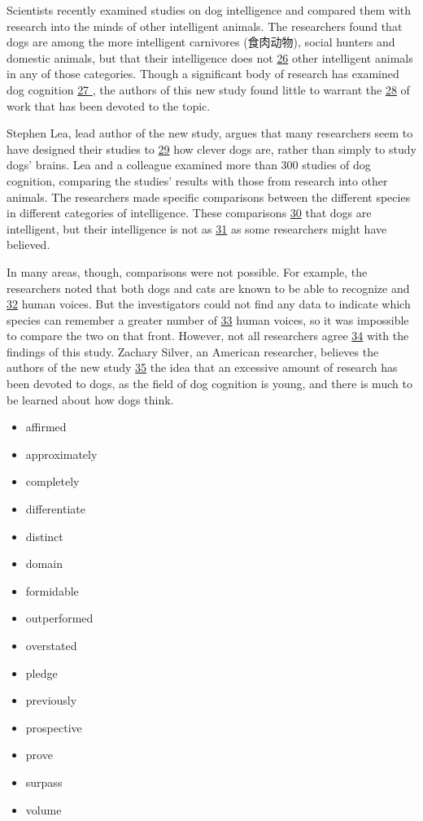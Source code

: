\documentclass[UTF8,11pt]{ctexart}
\begin{document}
Scientists recently examined studies on dog intelligence and compared them with research into the minds of other intelligent animals. The researchers found that dogs are among the more intelligent carnivores (食肉动物), social hunters and domestic animals, but that their intelligence does not \uline{26} other intelligent animals in any of those categories. Though a significant body of research has examined dog cognition \uline{27 }, the authors of this new study found little to warrant the \uline{28} of work that has been devoted to the topic.


Stephen Lea, lead author of the new study, argues that many researchers seem to have designed their studies to \uline{29} how clever dogs are, rather than simply to study dogs’ brains. Lea and a colleague examined more than 300 studies of dog cognition, comparing the studies’ results with those from research into other animals. The researchers made specific comparisons between the different species in different categories of intelligence. These comparisons \uline{30} that dogs are intelligent, but their intelligence is not as \uline{31} as some researchers might have believed.


In many areas, though, comparisons were not possible. For example, the researchers noted that both dogs and cats are known to be able to recognize and \uline{32} human voices. But the investigators could not find any data to indicate which species can remember a greater number of \uline{33} human voices, so it was impossible to compare the two on that front. However, not all researchers agree \uline{34} with the findings of this study. Zachary Silver, an American researcher, believes the authors of the new study \uline{35} the idea that an excessive amount of research has been devoted to dogs, as the field of dog cognition is young, and there is much to be learned about how dogs think.


\begin{itemize}[leftmargin=2em,itemsep=.2em,topsep=.4em]\item[A.] affirmed
\item[B.] approximately
\item[C.] completely
\item[D.] differentiate
\item[E.] distinct
\item[F.] domain
\item[G.] formidable
\item[H.] outperformed
\item[I.] overstated
\item[J.] pledge
\item[K.] previously
\item[L.] prospective
\item[M.] prove
\item[N.] surpass
\item[O.] volume
\end{itemize}
\end{document}
